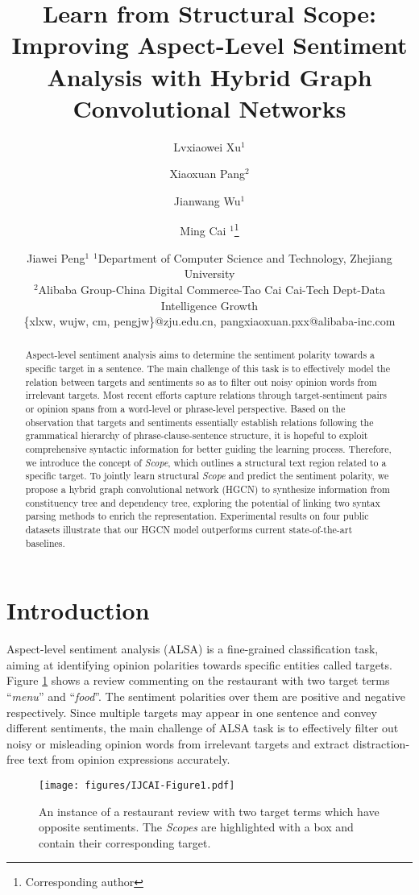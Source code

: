 \documentclass{article}
\title{Learn from Structural Scope: Improving Aspect-Level Sentiment Analysis with Hybrid Graph Convolutional Networks}
\author{
Lvxiaowei Xu$^1$
\and
Xiaoxuan Pang$^2$\and
Jianwang Wu$^{1}$\and
Ming Cai $^{1}$\footnote{ Corresponding author}\and
Jiawei Peng$^1$
\affiliations
$^1$Department of Computer Science and Technology, Zhejiang University\\
$^2$Alibaba Group-China Digital Commerce-Tao Cai Cai-Tech Dept-Data Intelligence Growth\\
\emails
\{xlxw, wujw, cm, pengjw\}@zju.edu.cn,
pangxiaoxuan.pxx@alibaba-inc.com
}
\begin{document}
\maketitle

\begin{abstract}
Aspect-level sentiment analysis aims to determine the sentiment polarity towards a specific target in a sentence. The main challenge of this task is to effectively model the relation between targets and sentiments so as to filter out noisy opinion words from irrelevant targets. Most recent efforts capture relations through target-sentiment pairs or opinion spans from a word-level or phrase-level perspective. Based on the observation that targets and sentiments essentially establish relations following the grammatical hierarchy of phrase-clause-sentence structure, it is hopeful to exploit comprehensive syntactic information for better guiding the learning process. Therefore, we introduce the concept of \emph{Scope}, which outlines a structural text region related to a specific target. To jointly learn structural \emph{Scope} and predict the sentiment polarity, we propose a hybrid graph convolutional network (HGCN) to synthesize information from constituency tree and dependency tree, exploring the potential of linking two syntax parsing methods to enrich the representation. Experimental results on four public datasets illustrate that our HGCN model outperforms current state-of-the-art baselines.
\end{abstract}

\section{Introduction}
Aspect-level sentiment analysis (ALSA) is a fine-grained classification task, aiming at identifying opinion polarities towards specific entities called targets. Figure \ref{fig1} shows a review commenting on the restaurant with two target terms ``\emph{menu}'' and ``\emph{food}''. The sentiment polarities over them are positive and negative respectively. Since multiple targets may appear in one sentence and convey different sentiments, the main challenge of ALSA task is to effectively filter out noisy or misleading opinion words from irrelevant targets and extract distraction-free text from opinion expressions accurately.
\begin{figure}[t]
	\centering
	\texttt{[image: figures/IJCAI-Figure1.pdf]} 
	\caption{An instance of a restaurant review with two target terms which have opposite sentiments. The \emph{Scopes} are highlighted with a box and contain their corresponding target.}
	\label{fig1}
\end{figure}
\end{document}
